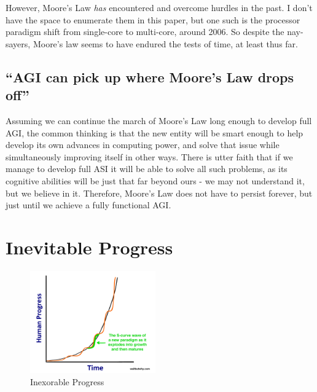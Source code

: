 \documentclass[12pt]{article} %
\begin{document}
However, Moore's Law \textit{has} encountered and overcome hurdles in the past\cite{hurdle}\cite{speeds}. I don't have the space to enumerate them in this paper, but one such is the processor paradigm shift from single-core to multi-core, around 2006. So despite the nay-sayers, Moore's law seems to have endured the tests of time, at least thus far.


\subsection{``AGI can pick up where Moore's Law drops off''} %

Assuming we can continue the march of Moore's Law long enough to develop full AGI, the common thinking is that the new entity will be smart enough to help develop its own advances in computing power\cite{wbw}, and solve that issue while simultaneously improving itself in other ways. There is utter faith that if we manage to develop full ASI it will be able to solve all such problems, as its cognitive abilities will be just that far beyond ours - we may not understand it, but we believe in it. Therefore, Moore's Law does not have to persist forever, but just until we achieve a fully functional AGI.


\section{Inevitable Progress} %

\begin{figure}
  \begin{center}
    \includegraphics[width=0.48\textwidth]{curvyexponential.png}
  \end{center}
  \caption{Inexorable Progress}
\end{figure}
\end{document}
